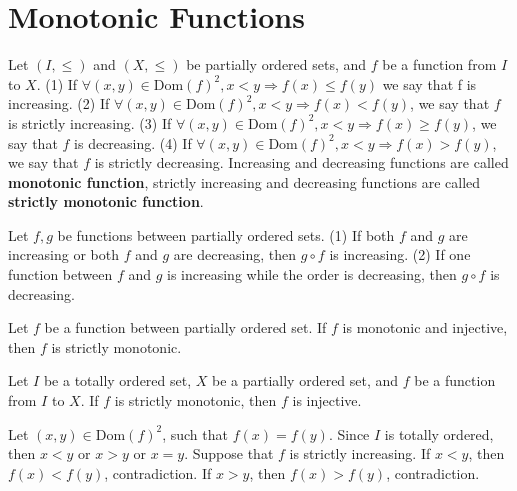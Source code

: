 \section{Monotonic Functions}
\begin{definitionenv}
    Let $(I, \le)$ and $(X, \le)$ be partially ordered sets, and $f$ be a function from $I$
 to $X$.
 \newline
 (1) If $\forall(x, y)\in \mathrm{Dom}(f)^2, x<y \Rightarrow f(x)\le f(y)$ we say that f is increasing.
 \newline
 (2) If $\forall (x, y)\in \mathrm{Dom}(f)^2, x<y \Rightarrow f(x)< f(y)$,  we say that $f$ is strictly increasing.
 \newline
  (3) If $\forall (x, y)\in \mathrm{Dom}(f)^2, x<y \Rightarrow f(x)\geq  f(y)$,  we say that $f$ is decreasing.
\newline
 (4) If $\forall (x, y)\in \mathrm{Dom}(f)^2, x<y \Rightarrow f(x)> f(y)$,  we say that $f$ is strictly decreasing.
 \newline
\quad Increasing and decreasing functions are called \textbf{monotonic function},  strictly increasing and decreasing functions are called \textbf{strictly monotonic function}.
\end{definitionenv}
\begin{propositionenv}
    Let $f, g$ be functions between partially ordered sets.
    \newline
    (1) If both $f$ and $g$ are increasing or both $f$ and $g$ are decreasing, then $g\circ f $ is increasing.
    \newline
    (2) If one function between $f$ and $g$ is increasing while the order is decreasing, then $g\circ f $ is decreasing.
\end{propositionenv}
\begin{propositionenv}
    Let $f$ be a function between partially ordered set. If $f$ is monotonic and injective,  then $f$ is strictly monotonic.
\end{propositionenv}
\begin{propositionenv}
    Let $I$ be a totally ordered set, $X$ be a partially ordered set, and $f$ be a function from $I$ to $X$. If $f$ is strictly monotonic,  then $f$ is injective.
\end{propositionenv}
\begin{proofenv}
    Let $(x, y)\in \mathrm{Dom}(f)^2$, such that $f(x)=f(y)$. Since $I$ is totally ordered,  then $x<y$ or $x>y$ or $x=y$. Suppose that $f$ is strictly increasing. If $x<y $, then $f(x)<f(y)$,  contradiction. If $x>y $, then $f(x)>f(y)$,  contradiction.
\end{proofenv}
